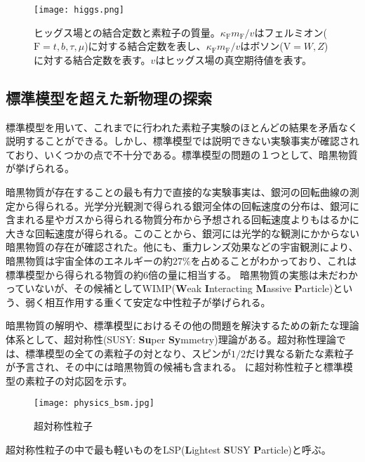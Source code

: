\begin{figure}[tbp]
  \centering
  \texttt{[image: higgs.png]}
  \caption[ヒッグス場との結合定数と素粒子の質量]{ヒッグス場との結合定数と素粒子の質量\cite{higgs}。$\kappa_\mathrm{F} m_\mathrm{F}/v$はフェルミオン($\mathrm{F}=t, b, \tau, \mu$)に対する結合定数を表し、$\kappa_\mathrm{F} m_\mathrm{F}/v$はボソン($\mathrm{V}=W, Z$)に対する結合定数を表す。$v$はヒッグス場の真空期待値を表す。 }
  \label{fig:higgs}
\end{figure}

\subsection{標準模型を超えた新物理の探索\cite{evidenceDark}}
\label{sec:bsm}

標準模型を用いて、これまでに行われた素粒子実験のほとんどの結果を矛盾なく説明することができる。しかし、標準模型では説明できない実験事実が確認されており、いくつかの点で不十分である。標準模型の問題の１つとして、暗黒物質が挙げられる。

暗黒物質が存在することの最も有力で直接的な実験事実は、銀河の回転曲線の測定から得られる。光学分光観測で得られる銀河全体の回転速度の分布は、銀河に含まれる星やガスから得られる物質分布から予想される回転速度よりもはるかに大きな回転速度が得られる。このことから、銀河には光学的な観測にかからない暗黒物質の存在が確認された。他にも、重力レンズ効果などの宇宙観測により、暗黒物質は宇宙全体のエネルギーの約$27\%$を占めることがわかっており、これは標準模型から得られる物質の約$6$倍の量に相当する。
暗黒物質の実態は未だわかっていないが、その候補としてWIMP(\textbf{W}eak \textbf{I}nteracting \textbf{M}assive \textbf{P}article)という、弱く相互作用する重くて安定な中性粒子が挙げられる。


暗黒物質の解明や、標準模型におけるその他の問題を解決するための新たな理論体系として、超対称性(SUSY: \textbf{Su}per \textbf{Sy}mmetry)理論がある。超対称性理論では、標準模型の全ての素粒子の対となり、スピンが$1/2$だけ異なる新たな素粒子が予言され、その中には暗黒物質の候補も含まれる。
に超対称性粒子と標準模型の素粒子の対応図を示す。
\begin{figure}[tbp]
  \centering
  \texttt{[image: physics\_bsm.jpg]}
  \caption[超対称性粒子]{超対称性粒子}
  \label{fig:physics_bsm}
\end{figure}
超対称性粒子の中で最も軽いものをLSP(\textbf{L}ightest \textbf{S}USY \textbf{P}article)と呼ぶ。


